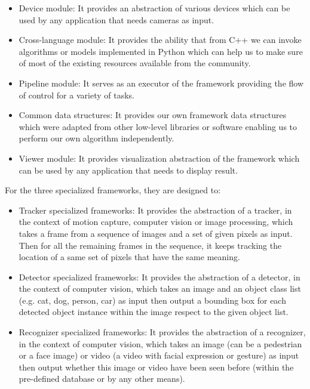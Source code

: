 \begin{itemize}
    \item Device module: It provides an abstraction of various devices which
    can be used by any application that needs cameras as input.

    \item Cross-language module: It provides the ability that from C++ we can
    invoke algorithms or models implemented in Python which can help us to make
    sure of most of the existing resources available from the community.

    \item Pipeline module: It serves as an executor of the framework providing
    the flow of control for a variety of tasks.

    \item Common data structures: It provides our own framework data structures
    which were adapted from other low-level libraries or software enabling us
    to perform our own algorithm independently.

    \item Viewer module: It provides visualization abstraction of the framework
    which can be used by any application that needs to display result.
\end{itemize}

For the three specialized frameworks, they are designed to:

\begin{itemize}
    \item Tracker specialized frameworks: It provides the abstraction of a 
    tracker, in the context of motion capture, computer vision or image 
    processing, which takes a frame from a sequence of images and a set of 
    given pixels as input. Then for all the remaining frames in the sequence, 
    it keeps tracking the location of a same set of pixels that have the same 
    meaning.

    \item Detector specialized frameworks: It provides the abstraction of a
    detector, in the context of computer vision, which takes an image and an
    object class list (e.g. cat, dog, person, car) as input then output a
    bounding box for each detected object instance within the image respect to 
    the given object list.

    \item Recognizer specialized frameworks: It provides the abstraction of a
    recognizer, in the context of computer vision, which takes an image (can be
    a pedestrian or a face image) or video (a video with facial expression or
    gesture) as input then output whether this image or video have been seen
    before (within the pre-defined database or by any other means).
\end{itemize}

